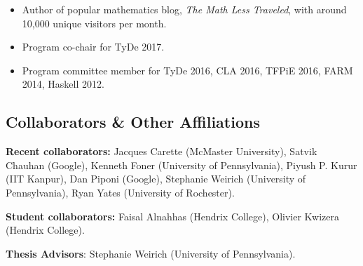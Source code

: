 
\begin{itemize}
  \item Author of popular mathematics blog, \emph{The Math Less
    Traveled}, with around 10,000 unique visitors per month.

  \item Program co-chair for TyDe 2017.

  \item Program committee member for TyDe 2016, CLA 2016, TFPiE 2016,
    FARM 2014, Haskell 2012.

\end{itemize}

\subsection*{Collaborators \& Other Affiliations}

\noindent

\textbf{Recent collaborators:} Jacques Carette (McMaster University),
Satvik Chauhan (Google), Kenneth Foner (University of Pennsylvania),
Piyush P. Kurur (IIT Kanpur), Dan Piponi (Google), Stephanie Weirich
(University of Pennsylvania), Ryan Yates (University of Rochester).

{\bf Student collaborators:} Faisal Alnahhas (Hendrix College),
Olivier Kwizera (Hendrix College).

\textbf{Thesis Advisors}: Stephanie Weirich (University of Pennsylvania).
